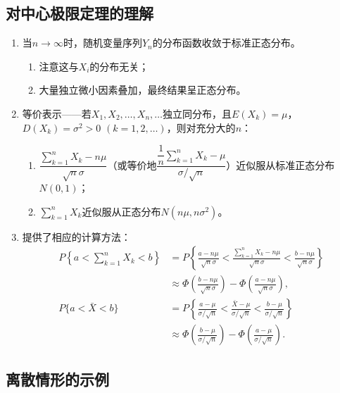 \documentclass[11pt,a4paper]{report}
\theoremstyle{definition}
\begin{document}
\subsection{对中心极限定理的理解}

\begin{enumerate}[label=\arabic*.,leftmargin=2em]
    \item 当$n\to\infty$时，随机变量序列$Y_{n}$的分布函数收敛于标准正态分布。
    \begin{enumerate}[label=1.\arabic*.,leftmargin=2em]
        \item 注意这与$X_{i}$的分布无关；
        \item 大量独立微小因素叠加，最终结果呈正态分布。
    \end{enumerate}
    \item 等价表示——若$X_{1},X_{2},\ldots,X_{n},\ldots$独立同分布，且$E(X_{k})=\mu$，$D(X_{k})=\sigma^{2}>0$ $(k=1,2,\ldots)$，则对充分大的$n$：
    \begin{enumerate}[label=2.\arabic*.,leftmargin=2em]
        \item $\dfrac{\sum_{k=1}^{n}X_{k}-n\mu}{\sqrt{n}\sigma}$（或等价地$\dfrac{\dfrac{1}{n}\sum_{k=1}^{n}X_{k}-\mu}{\sigma/\sqrt{n}}$）近似服从标准正态分布$N(0,1)$；
        \item $\sum_{k=1}^{n}X_{k}$近似服从正态分布$N(n\mu,n\sigma^{2})$。
    \end{enumerate}
    \item 提供了相应的计算方法：
    \begin{align*}
    P\left\{a<\sum_{k=1}^{n}X_{k}<b\right\}&=P\left\{\frac{a-n\mu}{\sqrt{n}\sigma}<\frac{\sum_{k=1}^{n}X_{k}-n\mu}{\sqrt{n}\sigma}<\frac{b-n\mu}{\sqrt{n}\sigma}\right\}\\
    &\approx\Phi\left(\frac{b-n\mu}{\sqrt{n}\sigma}\right)-\Phi\left(\frac{a-n\mu}{\sqrt{n}\sigma}\right),\\[0.5em]
    P\{a<\bar{X}<b\}&=P\left\{\frac{a-\mu}{\sigma/\sqrt{n}}<\frac{\bar{X}-\mu}{\sigma/\sqrt{n}}<\frac{b-\mu}{\sigma/\sqrt{n}}\right\}\\
    &\approx\Phi\left(\frac{b-\mu}{\sigma/\sqrt{n}}\right)-\Phi\left(\frac{a-\mu}{\sigma/\sqrt{n}}\right).
    \end{align*}
\end{enumerate}

\subsection{离散情形的示例}
\end{document}

